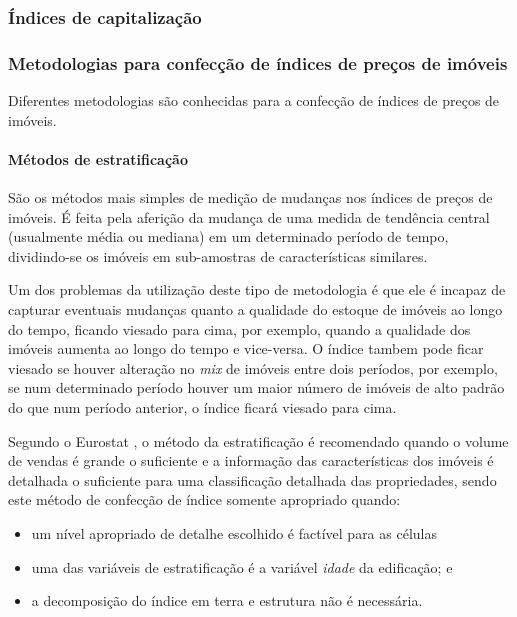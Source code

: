 \documentclass[
	12pt,				%
	oneside,			%
	a4paper,			%
	chapter=TITLE,		%
	section=TITLE,		%
	english,			%
	brazil				%
	]{abntex2}
\begin{document}
\subsubsection{Índices de
capitalização}\label{uxedndices-de-capitalizauxe7uxe3o}

\subsubsection{Metodologias para confecção de índices de preços de
imóveis}\label{metodologias-para-confecuxe7uxe3o-de-uxedndices-de-preuxe7os-de-imuxf3veis}

Diferentes metodologias são conhecidas para a confecção de índices de
preços de imóveis.

\paragraph{Métodos de
estratificação}\label{muxe9todos-de-estratificauxe7uxe3o}

São os métodos mais simples de medição de mudanças nos índices de preços
de imóveis. É feita pela aferição da mudança de uma medida de tendência
central (usualmente média ou mediana) em um determinado período de
tempo, dividindo-se os imóveis em sub-amostras de características
similares.

Um dos problemas da utilização deste tipo de metodologia é que ele é
incapaz de capturar eventuais mudanças quanto a qualidade do estoque de
imóveis ao longo do tempo, ficando viesado para cima, por exemplo,
quando a qualidade dos imóveis aumenta ao longo do tempo e vice-versa. O
índice tambem pode ficar viesado se houver alteração no \emph{mix} de
imóveis entre dois períodos, por exemplo, se num determinado período
houver um maior número de imóveis de alto padrão do que num período
anterior, o índice ficará viesado para cima.

Segundo o Eurostat \autocite*[158]{rppi}, o método da estratificação é
recomendado quando o volume de vendas é grande o suficiente e a
informação das características dos imóveis é detalhada o suficiente para
uma classificação detalhada das propriedades, sendo este método de
confecção de índice somente apropriado quando:
\begin{itemize}
\tightlist
\item
  um nível apropriado de detalhe escolhido é factível para as células
\item
  uma das variáveis de estratificação é a variável \emph{idade} da
  edificação; e
\item
  a decomposição do índice em terra e estrutura não é necessária.
\end{itemize}
\end{document}
